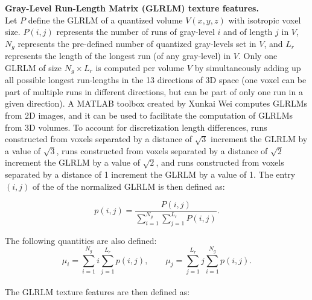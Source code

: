 \documentclass{article}
\begin{document}
\noindent \textbf{Gray-Level Run-Length Matrix (GLRLM) texture features.} \\
Let $P$ define the GLRLM of a quantized volume $V(x,y,z)$ with isotropic voxel size. $P(i,j)$ represents the number of runs of gray-level $i$ and of length $j$ in $V$, $N_g$ represents the pre-defined number of quantized gray-levels set in $V$, and $L_r$ represents the length of the longest run (of any gray-level) in $V$. Only one GLRLM of size $N_g \times L_r$ is computed per volume $V$ by simultaneously adding up all possible longest run-lengths in the 13 directions of 3D space (one voxel can be part of multiple runs in different directions, but can be part of only one run in a given direction). A MATLAB toolbox created by Xunkai Wei \cite{WeiX2008} computes GLRLMs from 2D images, and it can be used to facilitate the computation of GLRLMs from 3D volumes. To account for discretization length differences, runs constructed from voxels separated by a distance of $\sqrt{3}$ increment the GLRLM by a value of $\sqrt{3}$, runs constructed from voxels separated by a distance of $\sqrt{2}$ increment the GLRLM by a value of $\sqrt{2}$, and runs constructed from voxels separated by a distance of 1 increment the GLRLM by a value of 1. The entry $(i,j)$ of the of the normalized GLRLM is then defined as:

\[p(i,j) = \frac{P(i,j)}{\sum_{i=1}^{N_g}\sum_{j=1}^{L_r} P(i,j)}.\]

\noindent The following quantities are also defined:
\[\mu_i = \sum_{i=1}^{N_g} i \sum_{j=1}^{L_r} p(i,j), \qquad \mu_j = \sum_{j=1}^{L_r} j \sum_{i=1}^{N_g} p(i,j).\] \\

\noindent The GLRLM texture features are then defined as:
\end{document}
